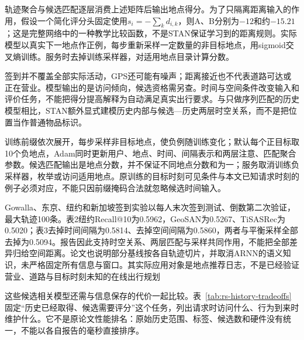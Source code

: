 轨迹聚合与候选匹配逐层消费上述矩阵后输出地点得分。为了只隔离距离输入的作用，假设一个简化评分头固定使用$s_i=-\sum_k d_{i,k}$，则A、B分别为$-12$和约$-15.21$；这是完整网络中的一种教学比较函数，不是STAN保证学习到的距离规则。实际模型以真实下一地点作正例，每步重新采样一定数量的非目标地点，用sigmoid交叉熵训练。服务时去掉训练采样器，对适用地点目录计算分数。

签到并不覆盖全部实际活动，GPS还可能有噪声；距离接近也不代表道路可达或正在营业。模型输出的是访问倾向，候选资格需另查。时间与空间条件改变输入和评价任务，不能把得分提高解释为自动满足真实出行要求。与只做序列匹配的历史模型相比，STAN额外显式建模历史内部与候选—历史两层时空关系，而不是把位置当作普通物品标识。

训练前缀依次展开，每步采样非目标地点，使负例随训练变化；默认每个正目标取10个负地点，Adam同时更新用户、地点、时间、间隔表示和两层注意、匹配聚合参数。候选匹配输出是地点分数，并不保证不同地点分数和为一；服务取消训练负采样器，枚举或访问适用地点。原训练的目标时刻可见条件与本文已知请求时刻的例子必须对应，不能只因前缀掩码合法就忽略候选时间输入。

Gowalla、东京、纽约和新加坡签到实验以每人末次签到测试、倒数第二次验证，最大轨迹100条。表2纽约Recall@10为0.5962，GeoSAN为0.5267、TiSASRec为0.5020；表3去掉时间间隔为0.5814、去掉空间间隔为0.5860，两者与平衡采样全部去掉为0.5094。报告因此支持时空关系、两层匹配与采样共同作用，不能把全部差异归给空间距离。论文也说明部分基线按各自轨迹切片，并取消ARNN的语义知识，未严格固定所有信息与窗口。其实际应用对象是地点推荐日志，不是已经验证营业、道路与目标时刻未知的在线出行规划

这些候选相关模型还需与信息保存的代价一起比较。表~\ref{tab:rs-history-tradeoffs}固定“历史已经取得、候选需要评分”这个任务，列出请求时访问什么、行为到来时维护什么。它不是原论文性能排名：原始历史范围、标签、候选数和硬件没有统一，不能以各自报告的毫秒直接排序。

